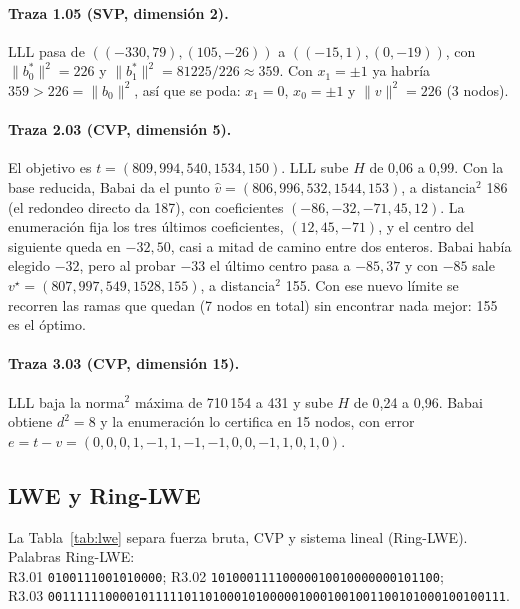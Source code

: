 \paragraph{Traza 1.05 (SVP, dimensión 2).}
LLL pasa de $((-330,79),(105,-26))$ a $((-15,1),(0,-19))$, con $\|b_0^*\|^2=226$ y
$\|b_1^*\|^2=81225/226\approx359$. Con $x_1=\pm1$ ya habría $359>226=\|b_0\|^2$, así que se poda:
$x_1=0$, $x_0=\pm1$ y $\|v\|^2=226$ (3 nodos).

\paragraph{Traza 2.03 (CVP, dimensión 5).}
El objetivo es $t=(809,994,540,1534,150)$. LLL sube $H$ de 0{,}06 a 0{,}99.
Con la base reducida, Babai da el punto $\widehat v=(806,996,532,1544,153)$, a distancia$^2$ 186
(el redondeo directo da 187), con coeficientes $(-86,-32,-71,45,12)$. La enumeración fija los tres
últimos coeficientes, $(12,45,-71)$, y el centro del siguiente queda en $-32{,}50$, casi a mitad
de camino entre dos enteros. Babai había elegido $-32$, pero al probar $-33$ el último centro pasa
a $-85{,}37$ y con $-85$ sale $v^\star=(807,997,549,1528,155)$, a distancia$^2$ 155. Con ese nuevo
límite se recorren las ramas que quedan (7 nodos en total) sin encontrar nada mejor: 155 es el óptimo.

\paragraph{Traza 3.03 (CVP, dimensión 15).}
LLL baja la norma$^2$ máxima de 710\,154 a 431 y sube $H$ de 0{,}24 a 0{,}96.
Babai obtiene $d^2=8$ y la enumeración lo certifica en 15 nodos, con error
$e=t-v=(0,0,0,1,-1,1,-1,-1,0,0,-1,1,0,1,0)$.

\subsection{LWE y Ring-LWE}
La Tabla~\ref{tab:lwe} separa fuerza bruta, CVP y sistema lineal (Ring-LWE). Palabras Ring-LWE:\\
R3.01 \texttt{0100111001010000}; R3.02 \texttt{10100011110000010010000000101100};\\
R3.03 \texttt{0011111100001011111011010001010000010001001001100101000100100111}.

\begin{table}[htb]
\centering

\caption{LWE por fuerza bruta (arriba), como CVP (en medio; L2.03 con ambos) y Ring-LWE (abajo).
$m$: ecuaciones; $c$: error máximo; Casos: $(2c+1)^n$. Mediana de 5 repeticiones.}
\label{tab:lwe}
\end{table}

